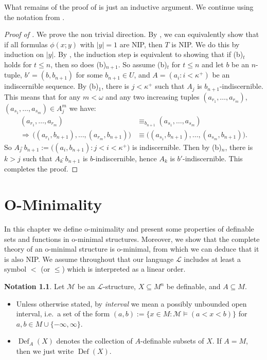 \documentclass[a4paper]{report}
\newcommand{\ind}{\hspace{15pt}}
\newcommand{\tophat}{\hat{\phantom{.}}}
\renewcommand{\L}{\mathcal{L}}
\newcommand{\M}{\mathcal{M}}
\renewcommand{\implies}{\Rightarrow}
\DeclareMathOperator{\Def}{Def}
\theoremstyle{definition}
\theoremstyle{remstyle}
\newtheorem*{notation}{Notation}
\begin{document}
\ind What remains of the proof of  is just an inductive argument. We continue using the notation from .

\begin{proof}[Proof of ]
	We prove the non trivial direction. By , we can equivalently show that if all formulas $\phi(x;y)$ with $|y|=1$ are NIP, then $T$ is NIP. We do this by induction on $|y|$. By , the induction step is equivalent to showing that if (b)$_t$ holds for $t\leq n$, then so does (b)$_{n+1}$. So assume (b)$_t$ for $t\leq n$ and let $b$ be an $n$-tuple, $b'=(b, b_{n+1})$ for some $b_{n+1}\in U$, and $A=(a_i:i<\kappa^{+})$ be an indiscernible sequence. By (b)$_1$, there is $j<\kappa^{+}$ such that $A_j$ is $b_{n+1}$-indiscernible. This means that for any $m<\omega$ and any two increasing tuples $(a_{r_1},\ldots,a_{r_m})$, $(a_{s_1},\ldots,a_{s_m})\in A^m_j$ we have:
	\begin{equation*}
		\begin{aligned}
			(a_{r_1},\ldots,a_{r_m})                                        & \equiv_{b_{n+1}}(a_{s_1},\ldots,a_{s_m})                       \\
			\implies\, \big((a_{r_1},b_{n+1}),\ldots,(a_{r_m},b_{n+1})\big) & \equiv \big((a_{s_1}, b_{n+1}),\ldots,(a_{s_m}, b_{n+1})\big).
		\end{aligned}
	\end{equation*}
	So $A_j\tophat b_{n+1} :=\big((a_i,b_{n+1}):j<i<\kappa^+\big)$ is indiscernible. Then by (b)$_n$, there is $k>j$ such that $A_k\tophat b_{n+1}$ is $b$-indiscernible, hence $A_k$ is $b'$-indiscernible. This completes the proof.
\end{proof}

\newpage

\chapter{O-Minimality}

\ind In this chapter we define o-minimality and present some properties of definable sets and functions in o-minimal structures. Moreover, we show that the complete theory of an o-minimal structure is o-minimal, from which we can deduce that it is also NIP. We assume throughout that our language $\L$ includes at least a symbol $<$ (or $\leq$) which is interpreted as a linear order.

\begin{notation} Let $\M$ be an $\L$-structure, $X\subseteq M^n$ be definable, and $A\subseteq M$.
	\begin{itemize}
		\item Unless otherwise stated, by \emph{interval} we mean a possibly unbounded open interval, i.e.\ a set of the form $(a,b):=\{x\in M: \M\models (a<x<b)\}$ for $a,b\in M\cup\{-\infty,\infty\}$.
		\item $\Def_A(X)$ denotes the collection of $A$-definable subsets of $X$. If $A=M$, then we just write $\Def(X)$.
	\end{itemize}
\end{notation}
\end{document}
